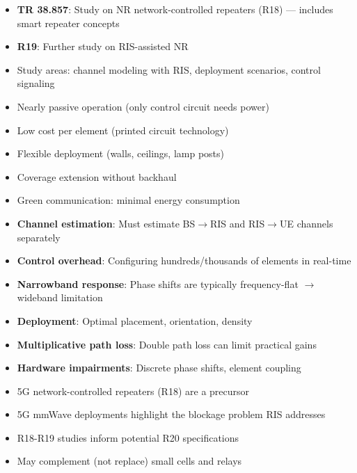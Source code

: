 
\begin{itemize}
\tightlist
\item
  \textbf{TR 38.857}: Study on NR network-controlled repeaters (R18) — includes smart repeater concepts
\item
  \textbf{R19}: Further study on RIS-assisted NR
\item
  Study areas: channel modeling with RIS, deployment scenarios, control signaling
\end{itemize}


\begin{itemize}
\tightlist
\item
  Nearly passive operation (only control circuit needs power)
\item
  Low cost per element (printed circuit technology)
\item
  Flexible deployment (walls, ceilings, lamp posts)
\item
  Coverage extension without backhaul
\item
  Green communication: minimal energy consumption
\end{itemize}


\begin{itemize}
\tightlist
\item
  \textbf{Channel estimation}: Must estimate BS\ensuremath{\to}RIS and RIS\ensuremath{\to}UE channels separately
\item
  \textbf{Control overhead}: Configuring hundreds/\allowbreak{}thousands of elements in real-time
\item
  \textbf{Narrowband response}: Phase shifts are typically frequency-flat \ensuremath{\to} wideband limitation
\item
  \textbf{Deployment}: Optimal placement, orientation, density
\item
  \textbf{Multiplicative path loss}: Double path loss can limit practical gains
\item
  \textbf{Hardware impairments}: Discrete phase shifts, element coupling
\end{itemize}


\begin{itemize}
\tightlist
\item
  5G network-controlled repeaters (R18) are a precursor
\item
  5G mmWave deployments highlight the blockage problem RIS addresses
\item
  R18-R19 studies inform potential R20 specifications
\item
  May complement (not replace) small cells and relays
\end{itemize}

